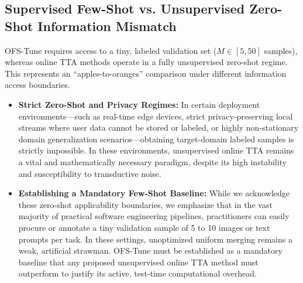 \documentclass{article}
\theoremstyle{plain}
\theoremstyle{definition}
\theoremstyle{remark}
\begin{document}
\subsection{Supervised Few-Shot vs. Unsupervised Zero-Shot Information Mismatch}
OFS-Tune requires access to a tiny, labeled validation set ($M \in [5, 50]$ samples), whereas online TTA methods operate in a fully unsupervised zero-shot regime. This represents an ``apples-to-oranges'' comparison under different information access boundaries.
\begin{itemize}[noitemsep,topsep=0pt]
    \item \textbf{Strict Zero-Shot and Privacy Regimes:} In certain deployment environments—such as real-time edge devices, strict privacy-preserving local streams where user data cannot be stored or labeled, or highly non-stationary domain generalization scenarios—obtaining target-domain labeled samples is strictly impossible. In these environments, unsupervised online TTA remains a vital and mathematically necessary paradigm, despite its high instability and susceptibility to transductive noise.
    \item \textbf{Establishing a Mandatory Few-Shot Baseline:} While we acknowledge these zero-shot applicability boundaries, we emphasize that in the vast majority of practical software engineering pipelines, practitioners can easily procure or annotate a tiny validation sample of 5 to 10 images or text prompts per task. In these settings, unoptimized uniform merging remains a weak, artificial strawman. OFS-Tune must be established as a mandatory baseline that any proposed unsupervised online TTA method must outperform to justify its active, test-time computational overhead.
\end{itemize}
\end{document}
